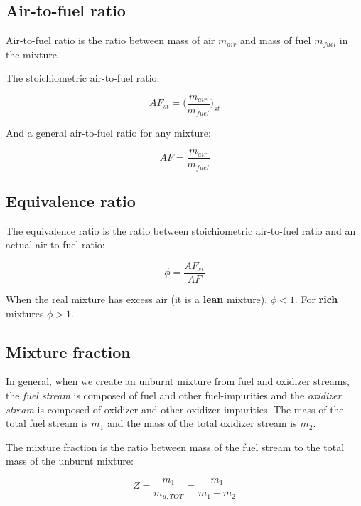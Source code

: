 \documentclass[10pt,twocolumn]{article}
\begin{document}
\subsection{Air-to-fuel ratio}

Air-to-fuel ratio is the ratio between mass of air $m_{air}$ and mass of fuel $m_{fuel}$ in the mixture.

The stoichiometric air-to-fuel ratio:

\begin{equation}
AF_{st} = \Big( \frac{m_{air}}{m_{fuel}} \Big)_{st}
\end{equation}

And a general air-to-fuel ratio for any mixture:

\begin{equation}
AF = \frac{m_{air}}{m_{fuel}}
\end{equation}

\subsection{Equivalence ratio}

The equivalence ratio is the ratio between stoichiometric air-to-fuel ratio and an actual air-to-fuel ratio:

\begin{equation}
\phi = \frac{AF_{st}}{AF}
\end{equation}

When the real mixture has excess air (it is a \textbf{lean} mixture), $\phi < 1$. For \textbf{rich} mixtures $\phi > 1$.





\subsection{Mixture fraction}

In general, when we create an unburnt mixture from fuel and oxidizer streams, the \textit{fuel stream} is composed of fuel and other fuel-impurities and the \textit{oxidizer stream} is composed of oxidizer and other oxidizer-impurities. The mass of the total fuel stream is $m_1$ and the mass of the total oxidizer stream is $m_2$.

The mixture fraction is the ratio between mass of the fuel stream to the total mass of the unburnt mixture:

\begin{equation}
Z = \frac{m_1}{m_{u, TOT}} = \frac{m_1}{m_1 + m_2}
\end{equation}
\end{document}
